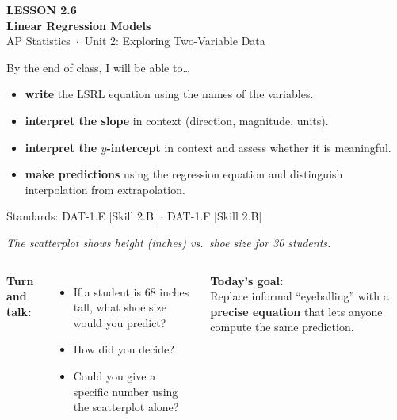\documentclass[aspectratio=169, 11pt]{beamer}
\begin{document}
{
\begin{frame}[plain]
  \vspace{2.8cm}\hspace{0.55cm}%
  \begin{minipage}{0.9\textwidth}
    {\color{goldacc}\bfseries\small LESSON 2.6}\\[0.5cm]
    {\color{white}\bfseries\LARGE Linear Regression Models}\\[1.2cm]
    {\color{skymid}\small AP Statistics~$\cdot$~Unit 2: Exploring Two-Variable Data}
  \end{minipage}
\end{frame}
}

\begin{frame}[t, plain]
  \vspace{0.3cm}
  By the end of class, I will be able to\dots
  \begin{itemize}
    \item \textbf{write} the LSRL equation using the names of the variables.
    \item \textbf{interpret the slope} in context (direction, magnitude, units).
    \item \textbf{interpret the $y$-intercept} in context and assess whether it is meaningful.
    \item \textbf{make predictions} using the regression equation and distinguish
          interpolation from extrapolation.
  \end{itemize}
  \vspace{0.4cm}
  \textcolor{goldacc}{\small Standards: DAT-1.E [Skill 2.B] $\cdot$ DAT-1.F [Skill 2.B]}
\end{frame}

\begin{frame}[t, plain]
  \vspace{0.3cm}
  \textit{The scatterplot shows height (inches) vs.\ shoe size for 30 students.}
  \vspace{0.3cm}
  \begin{columns}
      \textbf{Turn and talk:}
      \begin{itemize}
        \item If a student is 68 inches tall, what shoe size would you predict?
        \item How did you decide?
        \item Could you give a specific number using the scatterplot alone?
      \end{itemize}
      \textbf{Today's goal:}\\[6pt]
      Replace informal ``eyeballing'' with a \textbf{precise equation} that lets anyone
      compute the same prediction.
  \end{columns}
\end{frame}
\end{document}

